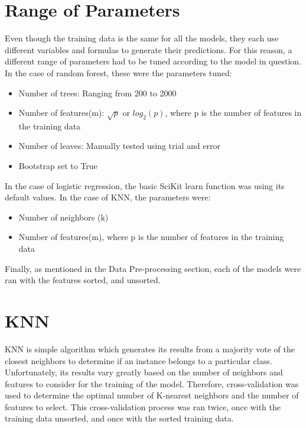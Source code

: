 \documentclass{article}
\begin{document}
\section{Range of Parameters}
Even though the training data is the same for all the models, they each use different variables and formulas to generate their predictions. For this reason, a different range of parameters had to be tuned according to the model in question. In the case of random forest, these were the parameters tuned:
\begin{itemize}
	\item Number of trees: Ranging from 200 to 2000
	\item Number of features(m): ${\sqrt{p}}$ or ${log_2(p)}$, where p is the number of features in the training data
	\item Number of leaves: Manually tested using trial and error
	\item Bootstrap set to True
\end{itemize}

In the case of logistic regression, the basic SciKit learn function was using its default values. In the case of KNN, the parameters were:
\begin{itemize}
	\item Number of neighbors (k)
	\item Number of features(m), where p is the number of features in the training data
\end{itemize}

Finally, as mentioned in the Data Pre-processing section, each of the models were ran with the features sorted, and unsorted. 


\section{KNN}
KNN is simple algorithm which generates its results from a majority vote of the closest neighbors to determine if an instance belongs to a particular class. Unfortunately, its results vary greatly based on the number of neighbors and  features to consider for the training of the model. Therefore, cross-validation was used to determine the optimal number of K-nearest neighbors and the number of features to select. This cross-validation process was ran twice, once with the training data unsorted, and once with the sorted training data. 
\end{document}
